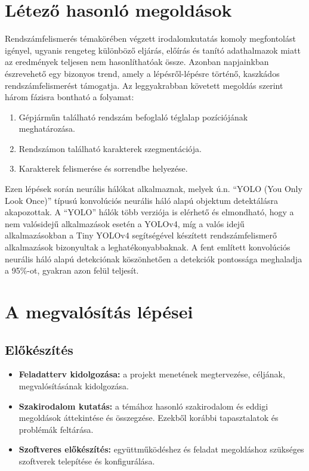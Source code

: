 \documentclass[12pt,a4paper]{article}
\begin{document}
    \section{Létező hasonló megoldások}
    Rendszámfelismerés témakörében végzett irodalomkutatás komoly megfontolást igényel, ugyanis rengeteg különböző eljárás, előírás és tanító adathalmazok miatt az eredmények teljesen nem hasonlíthatóak össze. Azonban napjainkban észrevehető egy bizonyos trend, amely a lépésről-lépésre történő, kaszkádos rendszámfelismerést támogatja.
    Az leggyakrabban követett megoldás szerint három fázisra bontható a folyamat: \cite{laroca2018robust}
    \begin{enumerate}
        \item Gépjárműn található rendszám befoglaló téglalap pozíciójának meghatározása.
        \item Rendszámon található karakterek szegmentációja.
        \item Karakterek felismerése és sorrendbe helyezése.
    \end{enumerate}
    Ezen lépések során neurális hálókat alkalmaznak, melyek ú.n. “YOLO (You Only Look Once)” típusú konvolúciós neurális háló alapú objektum detektálásra akapozottak. A “YOLO” hálók több verziója is elérhető és elmondható, hogy a nem valósidejű alkalmazások esetén a YOLOv4, míg a valós idejű alkalmazásokban a Tiny YOLOv4 segítségével készített rendszámfelismerő alkalmazások bizonyultak a leghatékonyabbaknak. \cite{laroca2021efficient}
    A fent említett konvolúciós neurális háló alapú detekciónak köszönhetően a detekciók pontossága meghaladja a 95\%-ot, gyakran azon felül teljesít. \cite{usama2022vehicle}
    \section{A megvalósítás lépései}
    \subsection{Előkészítés}
    \begin{itemize}
        \item \textbf{Feladatterv kidolgozása:} a projekt menetének megtervezése, céljának, megvalósításának kidolgozása.
        \item \textbf{Szakirodalom kutatás:} a témához hasonló szakirodalom és eddigi megoldások áttekintése és összegzése. Ezekből korábbi tapasztalatok és problémák feltárása.
        \item \textbf{Szoftveres előkészítés:} együttműködéshez és feladat megoldáshoz szükséges szoftverek telepítése és konfigurálása.
    \end{itemize}
    
\end{document}
